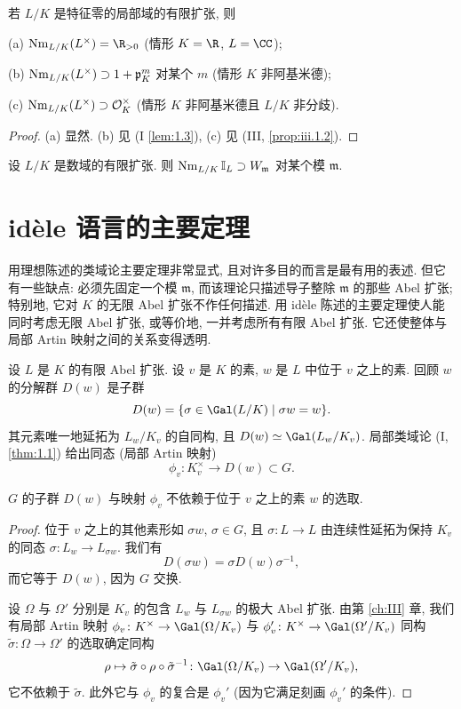 \begin{proposition}\label{prop:v.4.12}
若 $L/K$ 是特征零的局部域的有限扩张, 则

(a) $\Nm_{L/K}(L^{\times})=\R_{>0}$ (情形 $K=\R$, $L=\CC$);

(b) $\operatorname{Nm}_{L/K}(L^{\times})\supset 1+\mathfrak{p}_K^m$ 对某个 $m$ (情形 $K$ 非阿基米德);

(c) $\operatorname{Nm}_{L/K}(L^{\times})\supset\mathcal{O}_K^{\times}$ (情形 $K$ 非阿基米德且 $L/K$ 非分歧).
\end{proposition}

\begin{proof}
(a) 显然. (b) 见 (I \ref{lem:1.3}), (c) 见 (III, \ref{prop:iii.1.2}).
\end{proof}

\begin{corollary}\label{cor:v.4.13}
设 $L/K$ 是数域的有限扩张. 则 $\operatorname{Nm}_{L/K}\mathbb{I}_L\supset W_{\mathfrak{m}}$ 对某个模 $\mathfrak{m}$.
\end{corollary}

\section{idèle 语言的主要定理}\label{sec:V.5}

用理想陈述的类域论主要定理非常显式, 且对许多目的而言是最有用的表述. 但它有一些缺点: 必须先固定一个模 $\mathfrak{m}$, 而该理论只描述导子整除 $\mathfrak{m}$ 的那些 Abel 扩张; 特别地, 它对 $K$ 的无限 Abel 扩张不作任何描述. 用 idèle 陈述的主要定理使人能同时考虑无限 Abel 扩张, 或等价地, 一并考虑所有有限 Abel 扩张. 它还使整体与局部 Artin 映射之间的关系变得透明.

设 $L$ 是 $K$ 的有限 Abel 扩张. 设 $v$ 是 $K$ 的素, $w$ 是 $L$ 中位于 $v$ 之上的素. 回顾 $w$ 的分解群 $D(w)$ 是子群
\[
D(w)=\{\sigma\in\Gal(L/K)\mid\sigma w=w\}.
\]
其元素唯一地延拓为 $L_w/K_v$ 的自同构, 且 $D(w)\simeq\Gal(L_w/K_v)$. 局部类域论 (I, \ref{thm:1.1}) 给出同态 (局部 Artin 映射)
\[
\phi_v\colon K_v^{\times}\to D(w)\subset G.
\]

\begin{lemma}\label{lem:v.5.1}
$G$ 的子群 $D(w)$ 与映射 $\phi_v$ 不依赖于位于 $v$ 之上的素 $w$ 的选取.
\end{lemma}

\begin{proof}
位于 $v$ 之上的其他素形如 $\sigma w$, $\sigma\in G$, 且 $\sigma\colon L\to L$ 由连续性延拓为保持 $K_v$ 的同态 $\sigma\colon L_w\to L_{\sigma w}$. 我们有
\[
D(\sigma w)=\sigma D(w)\sigma^{-1},
\]
而它等于 $D(w)$, 因为 $G$ 交换.

设 $\Omega$ 与 $\Omega'$ 分别是 $K_v$ 的包含 $L_w$ 与 $L_{\sigma w}$ 的极大 Abel 扩张. 由第 \ref{ch:III} 章, 我们有局部 Artin 映射 $\phi_v\colon K^{\times}\to\Gal(\Omega/K_v)$ 与 $\phi_v'\colon K^{\times}\to\Gal(\Omega'/K_v)$ 同构 $\tilde{\sigma}\colon\Omega\to\Omega'$ 的选取确定同构
\[
\rho\mapsto\tilde{\sigma}\circ\rho\circ\tilde{\sigma}^{-1}\colon\Gal(\Omega/K_v)\to\Gal(\Omega'/K_v),
\]
它不依赖于 $\tilde{\sigma}$. 此外它与 $\phi_v$ 的复合是 $\phi_v'$ (因为它满足刻画 $\phi_v'$ 的条件).
\end{proof}

